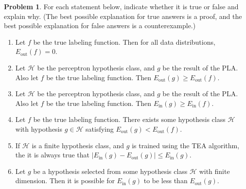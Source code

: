 \documentclass[10pt]{exam}
\theoremstyle{definition}
\newtheorem{problem}{Problem}
\newcommand{\Ein}{E_{\text{in}}}
\newcommand{\Eout}{E_{\text{out}}}
\begin{document}
\begin{problem}
    For each statement below, indicate whether it is true or false and explain why.
    (The best possible explanation for true answers is a proof, and the best possible explanation for false answers is a counterexample.)
    \begin{enumerate}
        \item Let $f$ be the true labeling function.  Then for all data distributions, $\Eout(f) = 0$.
            \vspace{3in}

        \item Let $\mathcal H$ be the perceptron hypothesis class, and $g$ be the result of the PLA.
            Also let $f$ be the true labeling function.
            Then $\Eout(g) \ge \Eout(f)$.
            \vspace{3in}

            \newpage
        \item Let $\mathcal H$ be the perceptron hypothesis class, and $g$ be the result of the PLA.
            Also let $f$ be the true labeling function.
            Then $\Ein(g) \ge \Ein(f)$.
            \vspace{3in}

        \item Let $f$ be the true labeling function.
            There exists some hypothesis class $\mathcal H$
            with hypothesis $g \in \mathcal H$ satisfying
            $\Eout(g) < \Eout(f)$.
            \vspace{3in}

        \item If $\mathcal H$ is a finite hypothesis class, and $g$ is trained using the TEA algorithm, the it is always true that $|\Ein(g) - \Eout(g)| \le \Ein(g)$.
            \vspace{3in}

        \item Let $g$ be a hypothesis selected from some hypothesis class $\mathcal H$ with finite dimension.  Then it is possible for $\Ein(g)$ to be less than $\Eout(g)$.
            \vspace{3in}


\end{enumerate}
\end{problem}
\end{document}
